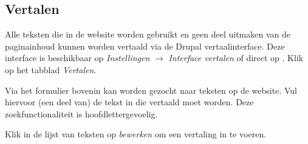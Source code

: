 
\subsection{Vertalen}
Alle teksten die in de website worden gebruikt en geen deel uitmaken van de paginainhoud kunnen worden vertaald via de Drupal vertaalinterface. Deze interface is beschikbaar op \emph{Instellingen} $\rightarrow$ \emph{Interface vertalen} of direct op . Klik op het tabblad \emph{Vertalen}.

Via het formulier bovenin kan worden gezocht naar teksten op de website. Vul hiervoor (een deel van) de tekst in die vertaald moet worden. Deze zoekfunctionaliteit is hoofdlettergevoelig.

Klik in de lijst van teksten op \emph{bewerken} om een vertaling in te voeren.